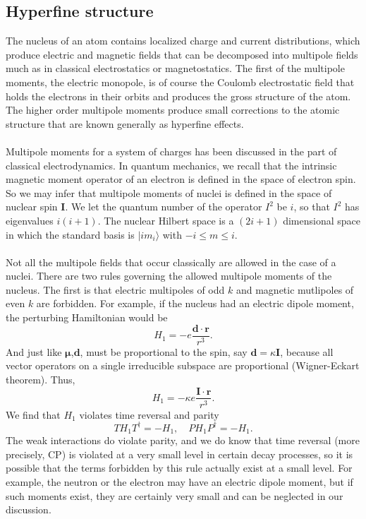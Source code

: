 \subsection{Hyperfine structure}
The nucleus of an atom contains localized charge and current distributions, which produce electric and magnetic fields that can be decomposed into multipole fields much as in classical electrostatics or magnetostatics.
The first of the multipole moments, the electric monopole, is of course the Coulomb electrostatic field that holds the electrons in their orbits and produces the gross structure of the atom.
The higher order multipole moments produce small corrections to the atomic structure that are known generally as hyperfine effects.
\\ \\
Multipole moments for a system of charges has been discussed in the part of classical electrodynamics. In quantum mechanics, we recall that the intrinsic magnetic moment operator of an electron is defined in the space of electron spin. So we may infer that multipole moments of nuclei is defined in the space of nuclear spin $\bm{I}$. 
We let the quantum number of the operator $I^2$ be $i$, so that $I^2$ has eigenvalues $i(i+1)$. The nuclear Hilbert space is a  $(2i+1)$ dimensional space in which the standard basis is $|im_i\rangle$ with $-i \leq m \leq i$.\\ \\
Not all the multipole fields that occur classically are allowed in the case of a nuclei. There are two rules governing the allowed multipole moments of the nucleus.
The first is that electric multipoles of odd $k$ and magnetic mutlipoles of even $k$ are forbidden. For example, if the nucleus had an electric dipole moment, the perturbing Hamiltonian would be
\[H_1 = -e \frac{\bm{d}\cdot\bm{r}}{r^3}.\]
And just like $\bm{\mu}$,$\bm{d}$, must be proportional to the spin, say $\bm{d} = \kappa\bm{I}$, because all vector operators on a single irreducible subspace are proportional (Wigner-Eckart theorem). Thus,
\[H_1 = -\kappa e \frac{\bm{I}\cdot\bm{r}}{r^3}.\]
We find that $H_1$ violates time reversal and parity
\[T H_1 T^{\dagger} = -H_1 , \quad P H_1 P^{\dagger} = -H_1.\]
The weak interactions do violate parity, and we do know that time reversal (more precisely, CP) is violated at a very small  level in certain decay processes, so it is possible that the terms forbidden by this rule actually exist at a small level. For example, the neutron or the electron may have an electric dipole moment, but if such moments exist, they are certainly very small and can be neglected in our discussion.
